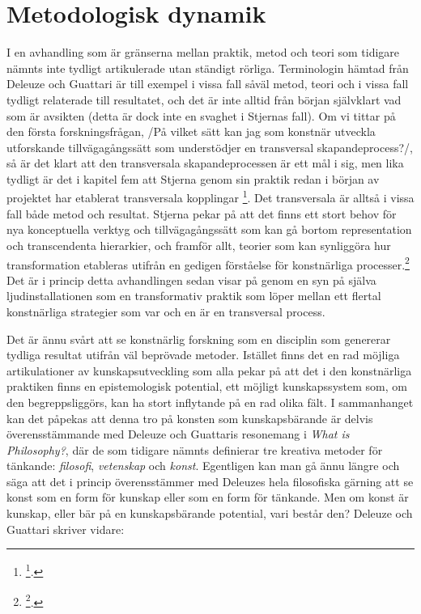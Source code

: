 \documentclass[11pt]{article}
\begin{document}
\section{Metodologisk dynamik}
\label{sec:orgeb5425f}
I en avhandling som är gränserna mellan praktik, metod och teori som
tidigare nämnts inte tydligt artikulerade utan ständigt rörliga.
Terminologin hämtad från Deleuze och Guattari är till exempel i vissa
fall såväl metod, teori och i vissa fall tydligt relaterade till
resultatet, och det är inte alltid från början självklart vad som är
avsikten (detta är dock inte en svaghet i Stjernas fall). Om vi tittar
på den första forskningsfrågan, /På vilket sätt kan jag som konstnär
utveckla utforskande tillvägagångssätt som understödjer en transversal
skapandeprocess?/, så är det klart att den transversala
skapandeprocessen är ett mål i sig, men lika tydligt är det i kapitel
fem att Stjerna genom sin praktik redan i början av projektet har
etablerat transversala kopplingar \footnote{\footcite[s.145]{Stjerna2018}.}. Det transversala är alltså i
vissa fall både metod och resultat. Stjerna pekar på att det finns ett
stort behov för nya konceptuella verktyg och tillvägagångssätt som kan
gå bortom representation och transcendenta hierarkier, och framför allt,
teorier som kan synliggöra hur transformation etableras utifrån en
gedigen förståelse för konstnärliga processer.\footnote{\footcite[s.85]{Stjerna2018}.} Det är i princip
detta avhandlingen sedan visar på genom en syn på själva
ljudinstallationen som en transformativ praktik som löper mellan ett
flertal konstnärliga strategier som var och en är en transversal
process.

Det är ännu svårt att se konstnärlig forskning som en disciplin som
genererar tydliga resultat utifrån väl beprövade metoder. Istället finns
det en rad möjliga artikulationer av kunskapsutveckling som alla pekar
på att det i den konstnärliga praktiken finns en epistemologisk
potential, ett möjligt kunskapssystem som, om den begreppsliggörs, kan
ha stort inflytande på en rad olika fält. I sammanhanget kan det påpekas
att denna tro på konsten som kunskapsbärande är delvis överensstämmande
med Deleuze och Guattaris resonemang i \emph{What is Philosophy?}, där de som
tidigare nämnts definierar tre kreativa metoder för tänkande:
\emph{filosofi}, \emph{vetenskap} och \emph{konst}. Egentligen kan man gå ännu längre
och säga att det i princip överensstämmer med Deleuzes hela filosofiska
gärning att se konst som en form för kunskap eller som en form för
tänkande. Men om konst är kunskap, eller bär på en kunskapsbärande
potential, vari består den? Deleuze och Guattari skriver vidare:
\end{document}
